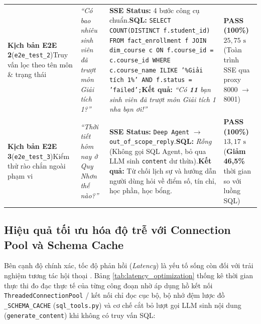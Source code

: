 \documentclass[12pt,a4paper]{report}
\begin{document}
\begin{table}[H]
\begin{tabular}{@{}p{2.8cm}p{4.3cm}p{4.8cm}p{2.4cm}@{}}
\addlinespace
\textbf{Kịch bản E2E 2}\newline (\texttt{e2e\_test\_2})\newline Truy vấn lọc theo tên môn \& trạng thái & \textit{``Có bao nhiêu sinh viên đã trượt môn Giải tích 1?''} & \textbf{SSE Status:} 4 bước công cụ chuẩn.\newline \textbf{SQL:} \texttt{SELECT COUNT(DISTINCT f.student\_id) FROM fact\_enrollment f JOIN dim\_course c ON f.course\_id = c.course\_id WHERE c.course\_name ILIKE '\%Giải tích 1\%' AND f.status = 'failed';}\newline \textbf{Kết quả:} \textit{``Có \textbf{11} bạn sinh viên đã trượt môn Giải tích 1 nha bạn ơi!''} & \textbf{PASS (100\%)}\newline $25{,}75\text{ s}$ (Toàn trình SSE qua proxy 8000 $\rightarrow$ 8001) \\
\addlinespace
\textbf{Kịch bản E2E 3}\newline (\texttt{e2e\_test\_3})\newline Kiểm thử rào chắn ngoài phạm vi & \textit{``Thời tiết hôm nay ở Quy Nhơn thế nào?''} & \textbf{SSE Status:} \texttt{Deep Agent} $\rightarrow$ \texttt{out\_of\_scope\_reply}.\newline \textbf{SQL:} \textit{Rỗng} (Không gọi SQL Agent, bỏ qua LLM sinh \texttt{content} dư thừa).\newline \textbf{Kết quả:} Từ chối lịch sự và hướng dẫn người dùng hỏi về điểm số, tín chỉ, học phần, học bổng. & \textbf{PASS (100\%)}\newline $13{,}17\text{ s}$ (\textbf{Giảm 46,5\%} thời gian so với luồng SQL) \\
\bottomrule
\end{tabular}
\end{table}

\subsection{Hiệu quả tối ưu hóa độ trễ với Connection Pool và Schema Cache}

Bên cạnh độ chính xác, tốc độ phản hồi (\textit{Latency}) là yếu tố sống còn đối với trải nghiệm tương tác hội thoại \cite{chen2025enterprise}. Bảng \ref{tab:latency_optimization} thống kê thời gian thực thi đo đạc thực tế của từng công đoạn nhờ áp dụng hồ kết nối \texttt{ThreadedConnectionPool} / kết nối chỉ đọc cục bộ, bộ nhớ đệm lược đồ \texttt{\_SCHEMA\_CACHE} (\texttt{sql\_tools.py}) và cơ chế cắt bỏ lượt gọi LLM sinh nội dung (\texttt{generate\_content}) khi không có truy vấn SQL:
\end{document}
